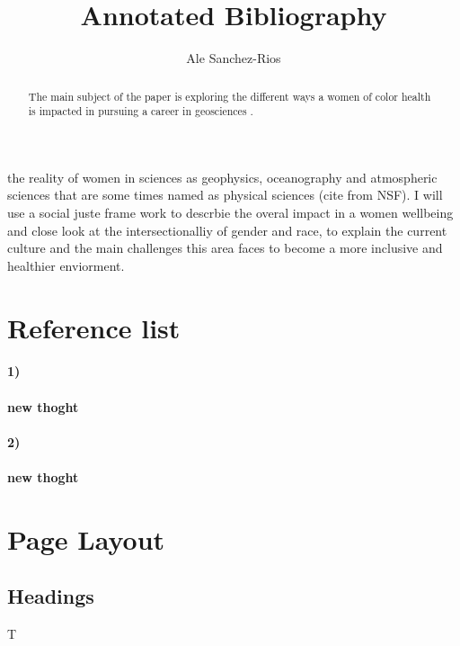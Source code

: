 \documentclass{tufte-handout}
\title{Annotated Bibliography}
\author[Ale Sanchez-Rios]{Ale Sanchez-Rios}
\begin{document}
\maketitle%

\begin{abstract}
\noindent The main subject of the paper is exploring the different ways a women of color health is impacted in pursuing a career in geosciences .
\end{abstract}


 the reality of women in sciences as geophysics, oceanography and atmospheric sciences that are some times named as physical sciences (cite from NSF). I will use a social juste frame work to descrbie the overal impact in a women wellbeing and close look at the intersectionalliy of gender and race, to explain the current culture and the main challenges this area faces to become a more inclusive and healthier enviorment. 

 \section{Reference list}
\paragraph{1)}
   
   \paragraph{new thoght}
\paragraph{2)}
   
   \paragraph{new thoght}


\section{Page Layout}\label{sec:page-layout}
\subsection{Headings}\label{sec:headings}
T






\end{document}
